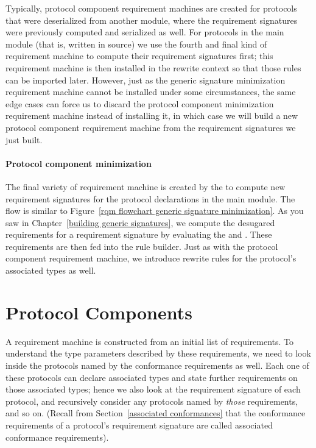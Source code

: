 \documentclass[../generics]{subfiles}
\begin{document}
%
%
%
Typically, protocol component requirement machines are created for protocols that were deserialized from another module, where the requirement signatures were previously computed and serialized as well. For protocols in the main module (that is, written in source) we use the fourth and final kind of requirement machine to compute their requirement signatures first; this requirement machine is then installed in the rewrite context so that those rules can be imported later. However, just as the generic signature minimization requirement machine cannot be installed under some circumstances, the same edge cases can force us to discard the protocol component minimization requirement machine instead of installing it, in which case we will build a new protocol component requirement machine from the requirement signatures we just built.

\paragraph{Protocol component minimization}
%
%
%
%
The final variety of requirement machine is created by the  to compute new requirement signatures for the protocol declarations in the main module. The flow is similar to Figure~\ref{rqm flowchart generic signature minimization}. As you saw in Chapter~\ref{building generic signatures}, we compute the desugared requirements for a requirement signature by evaluating the  and . These requirements are then fed into the rule builder. Just as with the protocol component requirement machine, we introduce rewrite rules for the protocol's associated types as well.

\section{Protocol Components}\label{protocol component}

%
%
%
A requirement machine is constructed from an initial list of requirements. To understand the type parameters described by these requirements, we need to look inside the protocols named by the conformance requirements as well. Each one of these protocols can declare associated types and state further requirements on those associated types; hence we also look at the requirement signature of each protocol, and recursively consider any protocols named by \emph{those} requirements, and so on. (Recall from Section~\ref{associated conformances} that the conformance requirements of a protocol's requirement signature are called associated conformance requirements).
\end{document}
